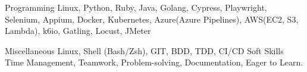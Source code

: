 

\begin{cvskills}

  \cvskill
    {Programming} %
    {Linux, Python, Ruby, Java, Golang, Cypress, Playwright, Selenium, Appium, Docker, Kubernetes, Azure(Azure Pipelines), AWS(EC2, S3, Lambda), k6io, Gatling, Locust, JMeter} %

  \cvskill
    {Miscellaneous} %
    {Linux, Shell (Bash/Zsh), GIT, BDD, TDD, CI/CD} %
  \cvskill
    {Soft Skills} %
    {Time Management, Teamwork, Problem-solving, Documentation, Eager to Learn.} %

\end{cvskills}
